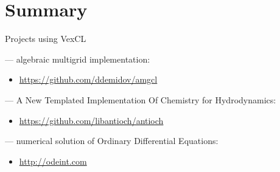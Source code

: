 \documentclass[@BEAMER_OPTIONS@]{beamer}
\begin{document}
\section{Summary}

\begin{frame}{Projects using VexCL}
    \begin{description}[\quad]
        \item[AMGCL] --- algebraic multigrid implementation:
            \begin{itemize}
                \item \href{https://github.com/ddemidov/amgcl}{https://github.com/ddemidov/amgcl}
            \end{itemize}
            \vspace{\baselineskip}
        \item[Antioch] --- A New Templated Implementation Of Chemistry for
            Hydrodynamics:
            \begin{itemize}
                \item \href{https://github.com/libantioch/antioch}{https://github.com/libantioch/antioch}
            \end{itemize}
            \vspace{\baselineskip}
        \item[Boost.odeint] --- numerical solution of Ordinary Differential
            Equations:
            \begin{itemize}
                \item \href{http://odeint.com}{http://odeint.com}
            \end{itemize}
    \end{description}
\end{frame}
\end{document}
